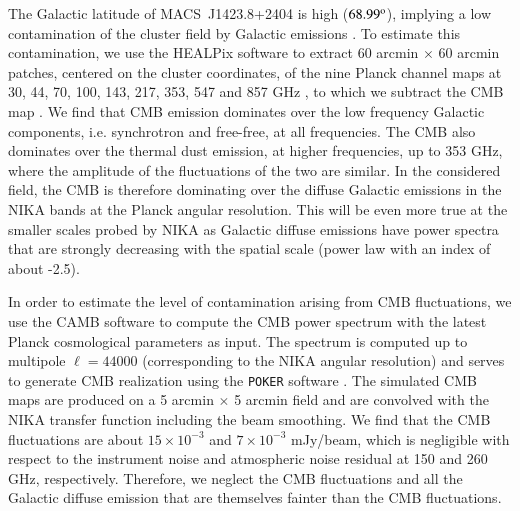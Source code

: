 \documentclass[twocolumn,traditabstract]{aa}
\begin{document}
The Galactic latitude of \mbox{MACS~J1423.8+2404} is high ($68.99^{\rm o}$), implying a low contamination of the cluster field by Galactic emissions \citep{planck2015X}. To estimate this contamination, we use the HEALPix software \citep{gorski2005} to extract 60 arcmin $\times$ 60 arcmin patches, centered on the cluster coordinates, of the nine Planck channel maps at 30, 44, 70, 100, 143, 217, 353, 547 and 857 GHz \citep{planck2015I}, to which we subtract the CMB map \citep{planck2015IX}. We find that CMB emission dominates over the low frequency Galactic components, i.e. synchrotron and free-free, at all frequencies. The CMB also dominates over the thermal dust emission, at higher frequencies, up to 353 GHz, where the amplitude of the fluctuations of the two are similar. In the considered field, the CMB is therefore dominating over the diffuse Galactic emissions in the NIKA bands at the Planck angular resolution. This will be even more true at the smaller scales probed by NIKA as Galactic diffuse emissions have power spectra that are strongly decreasing with the spatial scale (power law with an index of about -2.5).

In order to estimate the level of contamination arising from CMB fluctuations, we use the CAMB software \citep{lewis2000} to compute the CMB power spectrum with the latest Planck cosmological parameters \citep{planck2014param} as input. The spectrum is computed up to multipole $\ell = 44000$ (corresponding to the NIKA angular resolution) and serves to generate CMB realization using the {\tt POKER} software \citep{ponthieu2011}. The simulated CMB maps are produced on a 5 arcmin $\times$ 5 arcmin field and are convolved with the NIKA transfer function including the beam smoothing. We find that the CMB fluctuations are about $15 \times 10^{-3}$ and $7 \times 10^{-3}$ mJy/beam, which is negligible with respect to the instrument noise and atmospheric noise residual at 150 and 260 GHz, respectively. Therefore, we neglect the CMB fluctuations and all the Galactic diffuse emission that are themselves fainter than the CMB fluctuations.
\end{document}
